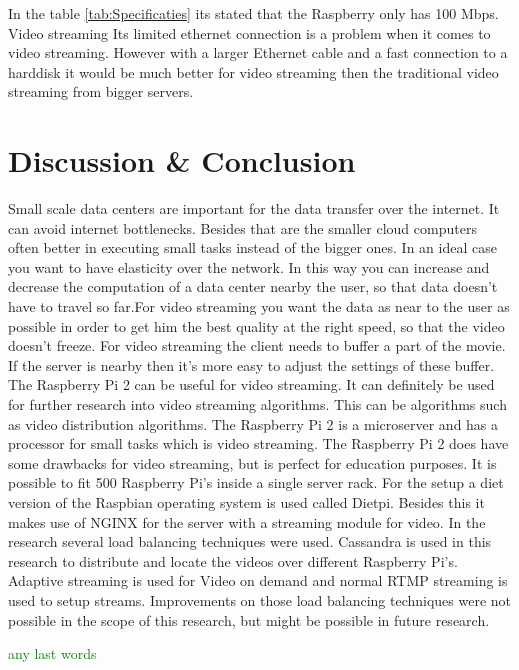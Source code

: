 \documentclass{sig-alternate-br}
\newcommand\todo[1]{
	\textcolor{green}{#1}
}
\begin{document}
In the table \ref{tab:Specificaties} its stated that the Raspberry only has 100 Mbps. Video streaming Its limited ethernet connection is a problem when it comes to video streaming. However with a larger Ethernet cable and a fast connection to a harddisk it would be much better for video streaming then the traditional video streaming from bigger servers.  

\section{Discussion \& Conclusion}
Small scale data centers are important for the data transfer over the internet. It can avoid internet bottlenecks. Besides that are the smaller cloud computers often better in executing small tasks instead of the bigger ones.  In an ideal case you want to have elasticity over the network. In this way you can increase and decrease the computation of a data center nearby the user, so that data doesn't have to travel so far.For video streaming you want the data as near to the user as possible in order to get him the best quality at the right speed, so that the video doesn't freeze. For video streaming the client needs to buffer a part of the movie. If the server is nearby then it's more easy to adjust the settings of these buffer.  \newline
The Raspberry Pi 2 can be useful for video streaming. It can definitely be used for further research into video streaming algorithms. This can be algorithms such as video distribution algorithms. The Raspberry Pi 2 is a microserver and has a processor for small tasks which is video streaming. The Raspberry Pi 2 does have some drawbacks for video streaming, but is perfect for education purposes. \newline
It is possible to fit 500 Raspberry Pi's inside a single server rack. \newline
For the setup a diet version of the Raspbian operating system is used called Dietpi. Besides this it makes use of NGINX for the server with a streaming module for video. \newline
In the research several load balancing techniques were used. Cassandra is used in this research to distribute and locate the videos over different Raspberry Pi's. Adaptive streaming is used for Video on demand and normal RTMP streaming is used to setup streams. Improvements on those load balancing techniques were not possible in the scope of this research, but might be possible in future research. 
\todo{any last words	}
\end{document}
